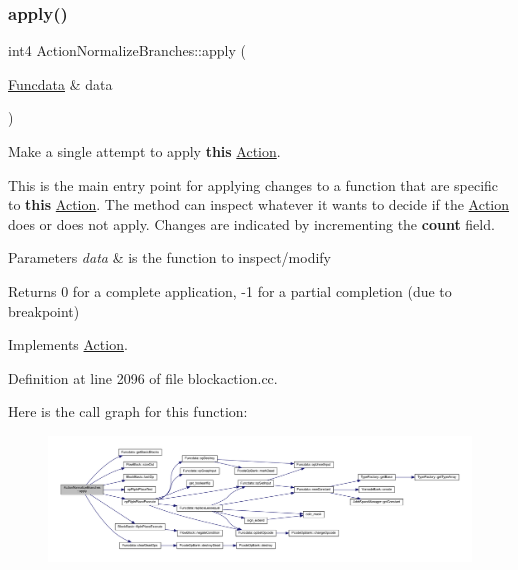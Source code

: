 \subsubsection{\texorpdfstring{apply()}{apply()}}
{\footnotesize\ttfamily int4 Action\+Normalize\+Branches\+::apply (\begin{DoxyParamCaption}\item[{\mbox{\hyperlink{class_funcdata}{Funcdata}} \&}]{data }\end{DoxyParamCaption})\hspace{0.3cm}{\ttfamily [virtual]}}



Make a single attempt to apply {\bfseries{this}} \mbox{\hyperlink{class_action}{Action}}. 

This is the main entry point for applying changes to a function that are specific to {\bfseries{this}} \mbox{\hyperlink{class_action}{Action}}. The method can inspect whatever it wants to decide if the \mbox{\hyperlink{class_action}{Action}} does or does not apply. Changes are indicated by incrementing the {\bfseries{count}} field. 
\begin{DoxyParams}{Parameters}
{\em data} & is the function to inspect/modify \\
\hline
\end{DoxyParams}
\begin{DoxyReturn}{Returns}
0 for a complete application, -\/1 for a partial completion (due to breakpoint) 
\end{DoxyReturn}


Implements \mbox{\hyperlink{class_action_aac1c3999d6c685b15f5d9765a4d04173}{Action}}.



Definition at line 2096 of file blockaction.\+cc.

Here is the call graph for this function\+:
\nopagebreak
\begin{figure}[H]
\begin{center}
\leavevmode
\includegraphics[width=350pt]{class_action_normalize_branches_a311d3d577d32dbe0f4c3dc23b731a035_cgraph}
\end{center}
\end{figure}
\mbox{\label{class_action_normalize_branches_a74bdc9457fe995592298c253dbf9fd88}} 
